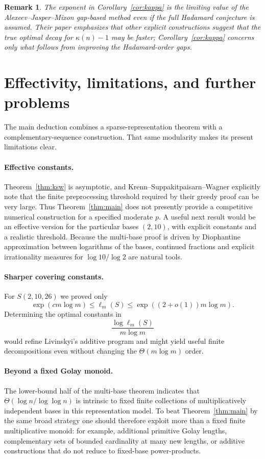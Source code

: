 \documentclass[11pt]{article}
\newtheorem{remark}[theorem]{Remark}
\begin{document}
\begin{remark}
The exponent in Corollary~\ref{cor:kappa} is the limiting value of the Alexeev--Jasper--Mixon gap-based method even if the full Hadamard conjecture is assumed.  Their paper emphasizes that other explicit constructions suggest that the true optimal decay for $\kappa(n)-1$ may be faster; Corollary~\ref{cor:kappa} concerns only what follows from improving the Hadamard-order gaps.
\end{remark}

\section{Effectivity, limitations, and further problems}
The main deduction combines a sparse-representation theorem with a complementary-sequence construction.  That same modularity makes its present limitations clear.

\paragraph{Effective constants.}
Theorem~\ref{thm:ksw} is asymptotic, and Krenn--Suppakitpaisarn--Wagner explicitly note that the finite preprocessing threshold required by their greedy proof can be very large.  Thus Theorem~\ref{thm:main} does not presently provide a competitive numerical construction for a specified moderate $p$.  A useful next result would be an effective version for the particular bases $(2,10)$, with explicit constants and a realistic threshold.  Because the multi-base proof is driven by Diophantine approximation between logarithms of the bases, continued fractions and explicit irrationality measures for $\log 10/\log 2$ are natural tools.

\paragraph{Sharper covering constants.}
For $S(2,10,26)$ we proved only
\[
\exp(c m\log m)\le\ell_m(S)\le\exp((2+o(1))m\log m).
\]
Determining the optimal constants in
\[
\frac{\log\ell_m(S)}{m\log m}
\]
would refine Livinskyi's additive program and might yield useful finite decompositions even without changing the $\Theta(m\log m)$ order.

\paragraph{Beyond a fixed Golay monoid.}
The lower-bound half of the multi-base theorem indicates that $\Theta(\log n/\log\log n)$ is intrinsic to fixed finite collections of multiplicatively independent bases in this representation model.  To beat Theorem~\ref{thm:main} by the same broad strategy one should therefore exploit more than a fixed finite multiplicative monoid: for example, additional primitive Golay lengths, complementary sets of bounded cardinality at many new lengths, or additive constructions that do not reduce to fixed-base power-products.
\end{document}
